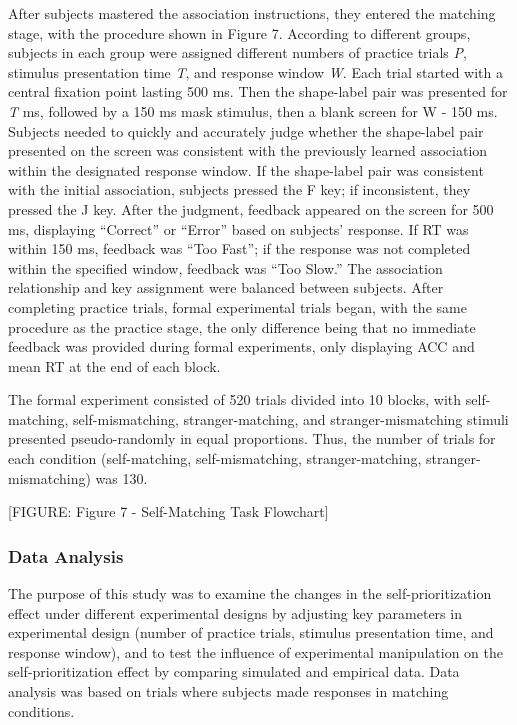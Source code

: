 \documentclass[
  english,
  man,floatsintext]{apa6}
\begin{document}
After subjects mastered the association instructions, they entered the matching stage, with the procedure shown in Figure 7. According to different groups, subjects in each group were assigned different numbers of practice trials \emph{P}, stimulus presentation time \emph{T}, and response window \emph{W}. Each trial started with a central fixation point lasting 500 ms. Then the shape-label pair was presented for \emph{T} ms, followed by a 150 ms mask stimulus, then a blank screen for W - 150 ms. Subjects needed to quickly and accurately judge whether the shape-label pair presented on the screen was consistent with the previously learned association within the designated response window. If the shape-label pair was consistent with the initial association, subjects pressed the F key; if inconsistent, they pressed the J key. After the judgment, feedback appeared on the screen for 500 ms, displaying ``Correct'' or ``Error'' based on subjects' response. If RT was within 150 ms, feedback was ``Too Fast''; if the response was not completed within the specified window, feedback was ``Too Slow.'' The association relationship and key assignment were balanced between subjects. After completing practice trials, formal experimental trials began, with the same procedure as the practice stage, the only difference being that no immediate feedback was provided during formal experiments, only displaying ACC and mean RT at the end of each block.

The formal experiment consisted of 520 trials divided into 10 blocks, with self-matching, self-mismatching, stranger-matching, and stranger-mismatching stimuli presented pseudo-randomly in equal proportions. Thus, the number of trials for each condition (self-matching, self-mismatching, stranger-matching, stranger-mismatching) was 130.

{[}FIGURE: Figure 7 - Self-Matching Task Flowchart{]}

\subsubsection{Data Analysis}\label{data-analysis-2}

The purpose of this study was to examine the changes in the self-prioritization effect under different experimental designs by adjusting key parameters in experimental design (number of practice trials, stimulus presentation time, and response window), and to test the influence of experimental manipulation on the self-prioritization effect by comparing simulated and empirical data. Data analysis was based on trials where subjects made responses in matching conditions.
\end{document}
